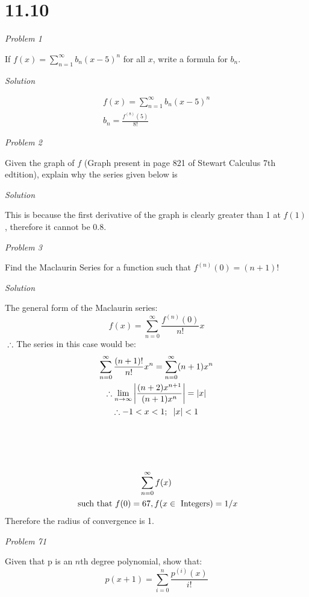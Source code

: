 \documentclass{article}
\newcommand{\qst}[1]{\newpage \begin{center}\textit{Problem #1}\end{center}}
\newcommand{\sol}{\begin{center}\textit{Solution}\end{center}}
\newcommand{\thf}{\\\therefore}
\begin{document}
\section{11.10}
 \begin{center}\textit{Problem 1}\end{center}
\begin{center}If $f(x)=\sum^{\infty}_{n=1} b_n (x-5)^n$ for all $x$, write a formula for $b_n$.\end{center}
\sol
\begin{gather*}
f(x)=\sum^{\infty}_{n=1} b_n (x-5)^n
\\b_n=\frac{f^{(8)}(5)}{8!}
\end{gather*}
\qst{2}
Given the graph of $f$ (Graph present in page 821 of Stewart Calculus 7th edtition), explain why the series given below is 
\sol
This is because the first derivative of the graph is clearly greater than 1 at $f(1)$, therefore it cannot be 0.8.
\qst{3}
\begin{center}Find the Maclaurin Series for a function such that $f^{(n)}(0)=(n+1)!$\end{center}
\sol
The general form of the Maclaurin series: $$f(x)=\sum^{\infty}_{n=0} \frac{f^{(n)}(0)}{n!}x$$
$\thf$ The series in this case would be:
\begin{gather*}
\sum^{\infty}_{n=0} \frac{(n+1)!}{n!}x^n=\sum^{\infty}_{n=0}(n+1)x^n
\thf \lim_{n\to\infty}\left|\frac{(n+2)x^{n+1}}{(n+1)x^n}\right|=|x|
\thf -1<x<1;\hspace{2mm}|x|<1
\\
\\
\\
\\
\\\sum^{\infty}_{n=0} f(x)
\\\text{ such that }f(0)=67, f(x \in \text{ Integers})=1/x
\end{gather*}
Therefore the radius of convergence is 1.
\qst{71}
Given that p is an $n$th degree polynomial, show that:
$$p(x+1)=\sum^{n}_{i=0}\frac{p^{(i)}(x)}{i!}$$
\end{document}
